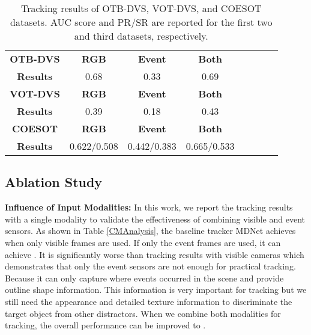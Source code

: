 \documentclass[journal]{IEEEtran}
\begin{document}
\begin{table}
\center
\small   
\caption{Tracking results of OTB-DVS, VOT-DVS, and COESOT datasets. AUC score and PR/SR are reported for the first two and third datasets, respectively.} 
\label{otbvotResults} 
\begin{tabular}{c|ccccccc} 		\hline \toprule [0.5 pt] 
\textbf{OTB-DVS} 			&\textbf{RGB} 	  	&\textbf{Event} 	  &\textbf{Both} 	      \\ 
\textbf{Results}   	&0.68  	&0.33 	&0.69  \\ 
\hline 
\textbf{VOT-DVS} 			&\textbf{RGB} 	  	&\textbf{Event} 	  &\textbf{Both} 		  \\
\textbf{Results}    &0.39   &0.18   &0.43  \\
\hline 
\textbf{COESOT} 			&\textbf{RGB} 	  	&\textbf{Event} 	  &\textbf{Both} 		  \\
\textbf{Results} 			&0.622/0.508 	  	&0.442/0.383 	  &0.665/0.533 		  \\
\hline \toprule [0.5 pt]
\end{tabular}
\end{table} 











 


 



\subsection{Ablation Study} 


\noindent 
\textbf{Influence of Input Modalities:} 
In this work, we report the tracking results with a single modality to validate the effectiveness of combining visible and event sensors. As shown in Table \ref{CMAnalysis}, the baseline tracker MDNet achieves  when only visible frames are used. If only the event frames are used, it can achieve . It is significantly worse than tracking results with visible cameras which demonstrates that only the event sensors are not enough for practical tracking. Because it can only capture where events occurred in the scene and provide outline shape information. This information is very important for tracking but we still need the appearance and detailed texture information to discriminate the target object from other distractors. When we combine both modalities for tracking, the overall performance can be improved to . 
\end{document}
